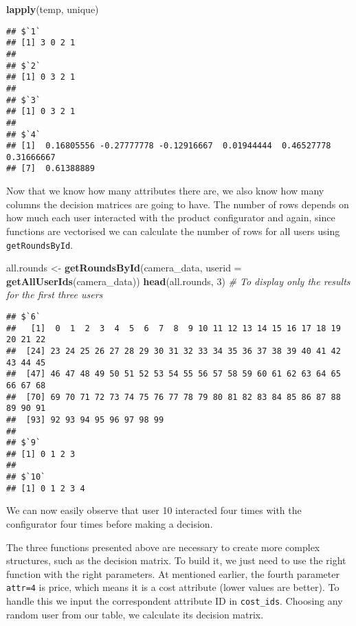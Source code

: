 \documentclass[]{article}
\newenvironment{Shaded}{\begin{snugshade}}{\end{snugshade}}
\newcommand{\KeywordTok}[1]{\textcolor[rgb]{0.13,0.29,0.53}{\textbf{{#1}}}}
\newcommand{\DataTypeTok}[1]{\textcolor[rgb]{0.13,0.29,0.53}{{#1}}}
\newcommand{\DecValTok}[1]{\textcolor[rgb]{0.00,0.00,0.81}{{#1}}}
\newcommand{\StringTok}[1]{\textcolor[rgb]{0.31,0.60,0.02}{{#1}}}
\newcommand{\CommentTok}[1]{\textcolor[rgb]{0.56,0.35,0.01}{\textit{{#1}}}}
\newcommand{\NormalTok}[1]{{#1}}
\begin{document}
\begin{Shaded}
\begin{Highlighting}[]
\KeywordTok{lapply}\NormalTok{(temp, unique)}
\end{Highlighting}
\end{Shaded}

\begin{verbatim}
## $`1`
## [1] 3 0 2 1
## 
## $`2`
## [1] 0 3 2 1
## 
## $`3`
## [1] 0 3 2 1
## 
## $`4`
## [1]  0.16805556 -0.27777778 -0.12916667  0.01944444  0.46527778  0.31666667
## [7]  0.61388889
\end{verbatim}

Now that we know how many attributes there are, we also know how many
columns the decision matrices are going to have. The number of rows
depends on how much each user interacted with the product configurator
and again, since functions are vectorised we can calculate the number of
rows for all users using \texttt{getRoundsById}.

\begin{Shaded}
\begin{Highlighting}[]
\NormalTok{all.rounds <-}\StringTok{ }\KeywordTok{getRoundsById}\NormalTok{(camera_data, }\DataTypeTok{userid =} \KeywordTok{getAllUserIds}\NormalTok{(camera_data))}
\KeywordTok{head}\NormalTok{(all.rounds, }\DecValTok{3}\NormalTok{) }\CommentTok{# To display only the results for the first three users}
\end{Highlighting}
\end{Shaded}

\begin{verbatim}
## $`6`
##   [1]  0  1  2  3  4  5  6  7  8  9 10 11 12 13 14 15 16 17 18 19 20 21 22
##  [24] 23 24 25 26 27 28 29 30 31 32 33 34 35 36 37 38 39 40 41 42 43 44 45
##  [47] 46 47 48 49 50 51 52 53 54 55 56 57 58 59 60 61 62 63 64 65 66 67 68
##  [70] 69 70 71 72 73 74 75 76 77 78 79 80 81 82 83 84 85 86 87 88 89 90 91
##  [93] 92 93 94 95 96 97 98 99
## 
## $`9`
## [1] 0 1 2 3
## 
## $`10`
## [1] 0 1 2 3 4
\end{verbatim}

We can now easily observe that user 10 interacted four times with the
configurator four times before making a decision.

The three functions presented above are necessary to create more complex
structures, such as the decision matrix. To build it, we just need to
use the right function with the right parameters. At mentioned earlier,
the fourth parameter \texttt{attr=4} is price, which means it is a cost
attribute (lower values are better). To handle this we input the
correspondent attribute ID in \texttt{cost\_ids}. Choosing any random
user from our table, we calculate its decision matrix.
\end{document}
